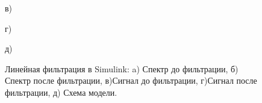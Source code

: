 \documentclass[10pt,a4paper]{article}
\begin{document}
\begin{figure}[H]
\begin{minipage}[h]{0.6\linewidth}
\end{minipage}
\vfill
\begin{minipage}[h]{0.6\linewidth}
 в) \\
\end{minipage}
\hfill
\begin{minipage}[h]{0.6\linewidth}
 г) \\
\end{minipage}
\hfill
\begin{minipage}[h]{0.6\linewidth}
 д) \\
\end{minipage}
\caption{Линейная фильтрация в Simulink: a) Спектр до фильтрации, б)
Спектр после фильтрации, в)Сигнал до фильтрации, г)Сигнал после фильтрации, д) Схема модели.}
\label{ris:experimentalcorrelationsignals}
\end{figure}
\FloatBarrier
\end{document}
